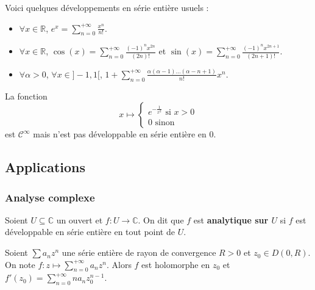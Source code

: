 	\begin{example}
		Voici quelques développements en série entière usuels :
		\begin{itemize}
			\item $\forall x \in \mathbb{R}$, $e^x = \sum_{n=0}^{+\infty} \frac{x^n}{n!}$.
			\item $\forall x \in \mathbb{R}$, $\cos(x) = \sum_{n=0}^{+\infty} \frac{(-1)^n x^{2n}}{(2n)!}$ et $\sin(x) = \sum_{n=0}^{+\infty} \frac{(-1)^n x^{2n+1}}{(2n+1)!}$.
			\item $\forall \alpha > 0$, $\forall x \in ]-1,1[$, $1 + \sum_{n=0}^{+\infty} \frac{\alpha(\alpha - 1) \dots (\alpha - n + 1)}{n!} x^n$.
		\end{itemize}
	\end{example}


	\begin{cexample}
		La fonction
		\[
		x \mapsto \begin{cases}
			e^{-\frac{1}{x^2}} \text{ si } x > 0 \\
			0 \text{ sinon}
		\end{cases}
		\]
		est $\mathcal{C}^\infty$ mais n'est pas développable en série entière en $0$.
	\end{cexample}

	\subsection{Applications}

	\subsubsection{Analyse complexe}


	\begin{definition}
		Soient $U \subseteq \mathbb{C}$ un ouvert et $f : U \rightarrow \mathbb{C}$. On dit que $f$ est \textbf{analytique sur $U$} si $f$ est développable en série entière en tout point de $U$.
	\end{definition}

	\begin{theorem}
		Soient $\sum a_n z^n$ une série entière de rayon de convergence $R > 0$ et $z_0 \in D(0,R)$. On note $f : z \mapsto \sum_{n=0}^{+\infty} a_n z^n$.
		Alors $f$ est holomorphe en $z_0$ et $f'(z_0) = \sum_{n=0}^{+\infty} n a_n z_0^{n-1}$.
	\end{theorem}

